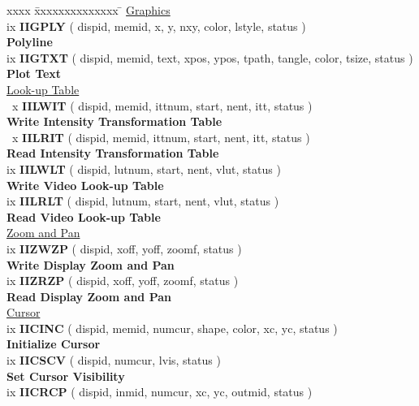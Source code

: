 \begin{tabbing}
xxxx \= xxxxxxxxxxxxxx \= \kill
\> \underline{Graphics}\\ [1.5ex]
ix \> {\bf IIGPLY} \> ( dispid, memid, x, y, nxy, color, lstyle, status )\\
                \> \> {\bf Polyline}\\ [1.5ex]
ix \> {\bf IIGTXT} \> ( dispid, memid, text, xpos, ypos, tpath, tangle, color,
                        tsize, status )\\
                \> \> {\bf Plot Text}\\ [1.5ex]
\> \underline{Look-up Table}\\ [1.5ex]
~x \> {\bf IILWIT} \> ( dispid, memid, ittnum, start, nent, itt, status )\\
                \> \> {\bf Write Intensity Transformation Table}\\ [1.5ex]
~x \> {\bf IILRIT} \> ( dispid, memid, ittnum, start, nent, itt, status )\\
                \> \> {\bf Read Intensity Transformation Table}\\ [1.5ex]
ix \> {\bf IILWLT} \> ( dispid, lutnum, start, nent, vlut, status )\\
                \> \> {\bf Write Video Look-up Table}\\ [1.5ex]
ix \> {\bf IILRLT} \> ( dispid, lutnum, start, nent, vlut, status )\\
                \> \> {\bf Read Video Look-up Table}\\ [1.5ex]
\> \underline{Zoom and Pan}\\ [1.5ex]
ix \> {\bf IIZWZP} \> ( dispid, xoff, yoff, zoomf, status )\\
                \> \> {\bf Write Display Zoom and Pan}\\ [1.5ex]
ix \> {\bf IIZRZP} \> ( dispid, xoff, yoff, zoomf, status )\\
                \> \> {\bf Read Display Zoom and Pan}\\ [1.5ex]
\> \underline{Cursor}\\ [1.5ex]
ix \> {\bf IICINC} \> ( dispid, memid, numcur, shape, color, xc, yc, status )\\
                \> \> {\bf Initialize Cursor}\\ [1.5ex]
ix \> {\bf IICSCV} \> ( dispid, numcur, lvis, status )\\
                \> \> {\bf Set Cursor Visibility}\\ [1.5ex]
ix \> {\bf IICRCP} \> ( dispid, inmid, numcur, xc, yc, outmid, status )\\

\end{tabbing}
